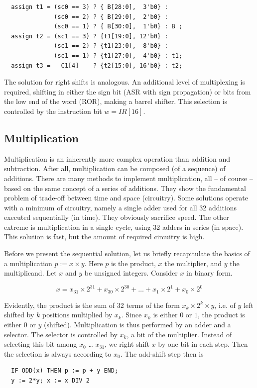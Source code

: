 \begin{verbatim}
  assign t1 = (sc0 == 3) ? { B[28:0],  3'b0} :
              (sc0 == 2) ? { B[29:0],  2'b0} :
              (sc0 == 1) ? { B[30:0],  1'b0} : B ;
  assign t2 = (sc1 == 3) ? {t1[19:0], 12'b0} :
              (sc1 == 2) ? {t1[23:0],  8'b0} :
              (sc1 == 1) ? {t1[27:0],  4'b0} : t1;
  assign t3 =   C1[4]    ? {t2[15:0], 16'b0} : t2;
\end{verbatim}

The solution for right shifts is analogous. An additional level of multiplexing is required, shifting in
either the sign bit (ASR with sign propagation) or bits from the low end of the word (ROR), making
a barrel shifter. This selection is controlled by the instruction bit $w = IR[16]$.

\subsection{Multiplication}
Multiplication is an inherently more complex operation than addition and subtraction. After all,
multiplication can be composed (of a sequence) of additions. There are many methods to
implement multiplication, all – of course – based on the same concept of a series of additions.
They show the fundamental problem of trade-off between time and space (circuitry). Some
solutions operate with a minimum of circuitry, namely a single adder used for all 32 additions
executed sequentially (in time). They obviously sacrifice speed. The other extreme is multiplication
in a single cycle, using 32 adders in series (in space). This solution is fast, but the amount of
required circuitry is high.

Before we present the sequential solution, let us briefly recapitulate the basics of a multiplication $p
:= x × y$. Here $p$ is the product, $x$ the multiplier, and $y$ the multiplicand. Let $x$ and $y$ be unsigned
integers. Consider $x$ in binary form.

\[  x = x_{31}×2^{31} + x_{30}×2^{30} + … + x_1×2^1 + x_0×2^0 \]

Evidently, the product is the sum of 32 terms of the form $x_k×2^k×y$, i.e. of $y$ left shifted by $k$ positions
multiplied by $x_k$. Since $x_k$ is either $0$ or $1$, the product is either $0$ or $y$ (shifted). Multiplication is thus
performed by an adder and a selector. The selector is controlled by $x_k$, a bit of the multiplier.
Instead of selecting this bit among $x_0$ … $x_{31}$, we right shift $x$ by one bit in each step. Then the
selection is always according to $x_0$. The add-shift step then is 
\begin{verbatim}
  IF ODD(x) THEN p := p + y END;
  y := 2*y; x := x DIV 2
\end{verbatim}

